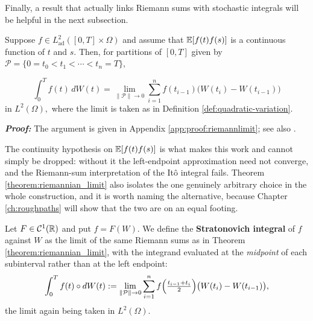 \medskip


Finally, a result that actually links Riemann sums with stochastic integrals will be helpful in the next subsection.

\begin{theorem}\label{theorem:riemannian_limit}
    Suppose $f\in L^2_{\mathrm{ad}}([0,T]\times\Omega)$ and assume that $\mathbb{E}[f(t)f(s)]$ is a continuous function of $t$ and $s$. Then, for partitions of $[0,T]$ given by $\mathcal{P}=\{0=t_0<t_1<\cdots<t_n=T\}$,

\begin{equation}
\int_0^T f(t)\, dW(t)
= \lim_{\|\mathcal P\|\to 0} \sum_{i=1}^n f(t_{i-1})\bigl(W(t_i)-W(t_{i-1})\bigr)
\end{equation}
in $L^2(\Omega),$ where the limit is taken as in Definition \ref{def:quadratic-variation}.
\end{theorem}
\textbf{\textit{Proof:}} The argument is given in Appendix \ref{app:proof:riemannlimit}; see also \cite[Thm.\ 4.7.1]{kuo2006}. \qedfilledtext

\medskip

\noindent The continuity hypothesis on $\mathbb{E}[f(t)f(s)]$ is what makes this work and cannot
simply be dropped: without it the left-endpoint approximation need not converge, and the Riemann-sum
interpretation of the Itô integral fails. Theorem \ref{theorem:riemannian_limit} also isolates the one genuinely arbitrary choice in the whole
construction, and it is worth naming the alternative, because Chapter \ref{ch:roughpaths} will show that
the two are on an equal footing.

\begin{definition}\label{def:stratonovich}
Let $F \in \mathcal{C}^1(\mathbb{R})$ and put $f = F(W)$. We define the \textbf{Stratonovich integral} of $f$ against
$W$ as the limit of the same Riemann sums as in Theorem \ref{theorem:riemannian_limit}, with the
integrand evaluated at the \emph{midpoint} of each subinterval rather than at the left endpoint:
\begin{equation}\label{eq:stratonovich}
\int_0^T f(t)\circ dW(t) := \lim_{\lVert\mathcal{P}\rVert\to0}\sum_{i=1}^{n}
f\Bigl(\tfrac{t_{i-1}+t_i}{2}\Bigr)\bigl(W(t_i)-W(t_{i-1})\bigr),
\end{equation}
the limit again being taken in $L^2(\Omega)$.
\end{definition}

